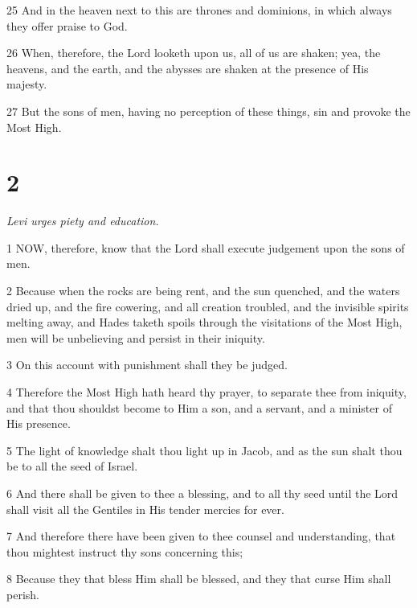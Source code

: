 \par 25 And in the heaven next to this are thrones and dominions, in which always they offer praise to God.

\par 26 When, therefore, the Lord looketh upon us, all of us are shaken; yea, the heavens, and the earth, and the abysses are shaken at the presence of His majesty.

\par 27 But the sons of men, having no perception of these things, sin and provoke the Most High.

\chapter{2}

\par \textit{Levi urges piety and education.}

\par 1 NOW, therefore, know that the Lord shall execute judgement upon the sons of men.

\par 2 Because when the rocks are being rent, and the sun quenched, and the waters dried up, and the fire cowering, and all creation troubled, and the invisible spirits melting away, and Hades taketh spoils through the visitations of the Most High, men will be unbelieving and persist in their iniquity.

\par 3 On this account with punishment shall they be judged.

\par 4 Therefore the Most High hath heard thy prayer, to separate thee from iniquity, and that thou shouldst become to Him a son, and a servant, and a minister of His presence.

\par 5 The light of knowledge shalt thou light up in Jacob, and as the sun shalt thou be to all the seed of Israel.

\par 6 And there shall be given to thee a blessing, and to all thy seed until the Lord shall visit all the Gentiles in His tender mercies for ever.

\par 7 And therefore there have been given to thee counsel and understanding, that thou mightest instruct thy sons concerning this;

\par 8 Because they that bless Him shall be blessed, and they that curse Him shall perish.

